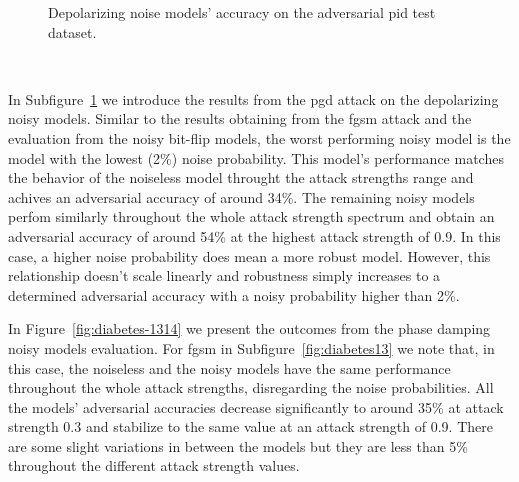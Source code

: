 \begin{figure}[!h]
\begin{subfigure}{0.45\textwidth}
      \label{fig:diabetes12}
  \end{subfigure}
  \caption{Depolarizing noise models' accuracy on the adversarial \ac{pid} test dataset.}
  \label{fig:diabetes-1112}
\end{figure} \

In Subfigure~\ref{fig:diabetes12} we introduce the results from the \ac{pgd}
attack on the depolarizing noisy models. Similar to the results obtaining
from the \ac{fgsm} attack and the evaluation from the noisy bit-flip models,
the worst performing noisy model is the model with the lowest (2\%)
noise probability. This model's performance matches the behavior of the
noiseless model throught the attack strengths range and achives an
adversarial accuracy of around 34\%. The remaining noisy models perfom
similarly throughout the whole attack strength spectrum and obtain
an adversarial accuracy of around 54\% at the highest attack strength
of 0.9. In this case, a higher noise probability does mean a more robust
model. However, this relationship doesn't scale linearly and robustness
simply increases to a determined adversarial accuracy with a noisy
probability higher than 2\%. \

In Figure~\ref{fig:diabetes-1314} we present the outcomes from the phase damping
noisy models evaluation. For \ac{fgsm} in Subfigure~\ref{fig:diabetes13}
we note that, in this case, the noiseless and the noisy models have the
same performance throughout the whole attack strengths, disregarding
the noise probabilities. All the models' adversarial accuracies decrease
significantly to around 35\% at attack strength 0.3 and stabilize to the
same value at an attack strength of 0.9. There are some slight variations in
between the models but they are less than 5\% throughout the different
attack strength values. \

